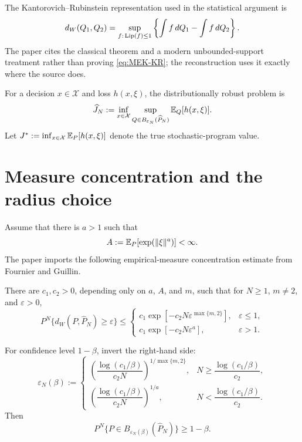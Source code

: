 The Kantorovich--Rubinstein representation used in the statistical argument is
\begin{equation}\label{eq:MEK-KR}
 d_W(Q_1,Q_2)
 =\sup_{f:\,\operatorname{Lip}(f)\le1}
 \left\{\int f\,dQ_1-\int f\,dQ_2\right\}.
\end{equation}
The paper cites the classical theorem and a modern unbounded-support treatment rather than proving \eqref{eq:MEK-KR}; the reconstruction uses it exactly where the source does.

For a decision $x\in\mathcal X$ and loss $h(x,\xi)$, the distributionally robust problem is
\begin{equation}\label{eq:MEK-DRO}
 \widehat J_N
 :=\inf_{x\in\mathcal X}
 \sup_{Q\in B_{\varepsilon_N}(\widehat P_N)}
 \mathbb{E}_Q[h(x,\xi)].
\end{equation}
Let $J^*:=\inf_{x\in\mathcal X}\mathbb{E}_P[h(x,\xi)]$ denote the true stochastic-program value.

\section{Measure concentration and the radius choice}
Assume that there is $a>1$ such that
\begin{equation}\label{eq:MEK-light-tail}
 A:=\mathbb{E}_P[\exp(\|\xi\|^a)]<\infty.
\end{equation}
The paper imports the following empirical-measure concentration estimate from Fournier and Guillin.

\begin{theorem}\label{thm:MEK-concentration}
There are $c_1,c_2>0$, depending only on $a$, $A$, and $m$, such that for $N\ge1$, $m\ne2$, and $\varepsilon>0$,
\begin{equation}\label{eq:MEK-concentration}
 P^N\{d_W(P,\widehat P_N)\ge\varepsilon\}
 \le
 \begin{cases}
 c_1\exp[-c_2N\varepsilon^{\max\{m,2\}}],&\varepsilon\le1,\\
 c_1\exp[-c_2N\varepsilon^a],&\varepsilon>1.
 \end{cases}
\end{equation}
\end{theorem}

For confidence level $1-\beta$, invert the right-hand side:
\begin{equation}\label{eq:MEK-radius}
 \varepsilon_N(\beta):=
 \begin{cases}
 \left(\dfrac{\log(c_1/\beta)}{c_2N}\right)^{1/\max\{m,2\}},
 &N\ge\dfrac{\log(c_1/\beta)}{c_2},\\[1.2ex]
 \left(\dfrac{\log(c_1/\beta)}{c_2N}\right)^{1/a},
 &N<\dfrac{\log(c_1/\beta)}{c_2}.
 \end{cases}
\end{equation}
Then
\[
 P^N\{P\in B_{\varepsilon_N(\beta)}(\widehat P_N)\}\ge1-\beta.
\]

